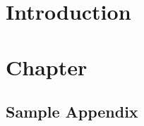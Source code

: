 \documentclass[a4paper, 11pt]{book}
\begin{document}
\mainmatter


\chapter{Introduction}
\label{chap:introduction}



\chapter{Chapter}
\label{chap:conclusions}




\titleformat{\chapter}[display]	%
{\normalfont\huge\bfseries}{\chaptertitlename\ \thechapter}{20pt}{\Huge}


\begin{appendix}			%
\chapter{Sample Appendix}	%
\label{app: sample appendix}

%

\end{appendix}
\end{document}
